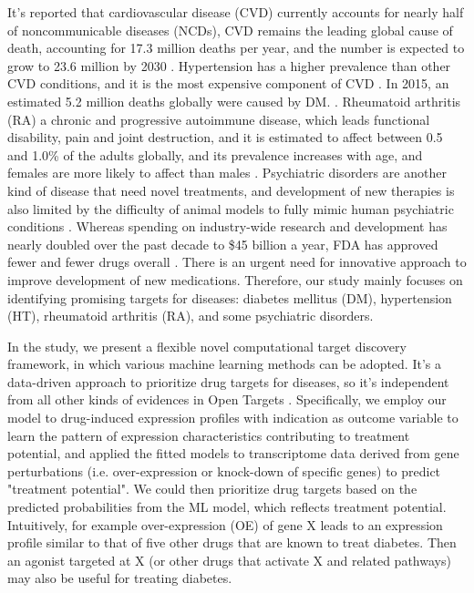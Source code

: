     It's reported that cardiovascular disease (CVD) currently accounts for nearly
    half of noncommunicable diseases (NCDs), CVD remains the leading global cause of
    death, accounting for 17.3 million deaths per year, and the number is expected to grow to 23.6 million by 2030 \cite{laslett2012worldwide}. Hypertension has a higher prevalence
    than other CVD conditions, and it is the most expensive component of CVD \cite{heidenreich2011forecasting}. In 2015, an estimated 5.2 million deaths globally were caused by DM. \cite{mozaffarian2015executive}. Rheumatoid arthritis (RA) a chronic and progressive autoimmune disease, which leads functional disability, pain and joint destruction, and it is estimated to affect between 0.5 and 1.0\% of the adults globally, and its prevalence increases with age, and females are more likely to affect than males \cite{kvien2004epidemiology}. Psychiatric disorders are another kind of disease that need novel treatments, and development of new therapies is also limited by the difficulty of animal models to fully mimic human psychiatric conditions \cite{powell2017transcriptomic}. Whereas spending on industry-wide research and development has nearly doubled over the past decade to \$45 billion a year, FDA has approved fewer and fewer drugs overall \cite{wilson2011drug}. There is an urgent need for innovative approach to improve development of new medications. Therefore, our study mainly focuses on identifying promising targets for diseases: diabetes mellitus (DM), hypertension (HT), rheumatoid arthritis (RA), and some psychiatric disorders.
  
    In the study, we present a flexible novel computational target discovery framework, in which various machine learning methods can be adopted. It's a data-driven approach to prioritize drug targets for diseases, so it's independent from all other kinds of evidences in Open Targets \cite{koscielny2017open}. Specifically, we employ our model to drug-induced expression profiles with indication as outcome variable to learn the pattern of expression characteristics contributing to treatment potential, and applied the fitted models to transcriptome data derived from gene perturbations (i.e. over-expression or knock-down of specific genes) to predict "treatment potential". We could then prioritize drug targets based on the predicted probabilities from the ML model, which reflects treatment potential. Intuitively, for example over-expression (OE) of gene X leads to an expression profile similar to that of five other drugs that are known to treat diabetes. Then an agonist targeted at X (or other drugs that activate X and related pathways) may also be useful for treating diabetes. 

